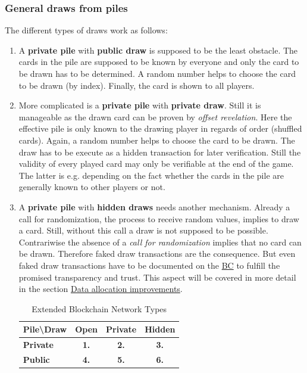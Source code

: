 \subsubsection{General draws from piles}
\label{sec:GDfP}
The different types of draws work as follows:
\begin{enumerate}	
	\item A \textbf{private pile} with \textbf{public draw} is supposed to be the least obstacle.
	The cards in the pile are supposed to be known by everyone and only the card to be drawn has to be determined.
	A random number helps to choose the card to be drawn (by index).
	Finally, the card is shown to all players.
	
	\item More complicated is a \textbf{private pile} with \textbf{private draw}.
	Still it is manageable as the drawn card can be proven by \textit{offset revelation}.
	Here the effective pile is only known to the drawing player in regards of order (shuffled cards).
	Again, a random number helps to choose the card to be drawn.
	The draw has to be execute as a hidden transaction for later verification.
	Still the validity of every played card may only be verifiable at the end of the game.
	The latter is e.g. depending on the fact whether the cards in the pile are generally known to other players or not.
	
	\item A \textbf{private pile} with \textbf{hidden draws} needs another mechanism.
	Already a call for randomization, the process to receive random values, implies to draw a card.
	Still, without this call a draw is not supposed to be possible.
	Contrariwise the absence of a \textit{call for randomization} implies that no card can be drawn.
	Therefore faked draw transactions are the consequence.
	But even faked draw transactions have to be documented on the \hyperref[sec:BCI]{BC} to fulfill the promised transparency and trust.
	This aspect will be covered in more detail in the section \hyperref[sec:DataAllocationImprovements]{Data allocation improvements}.
	
	\begin{table}
		\centering
		\begin{tabularx}{0.525\textwidth}{ l | c | c | c }
			\textbf{Pile\textbackslash Draw} & \textbf{Open} & \textbf{Private} & \textbf{Hidden} \\ \hline
			\textbf{Private} & \textbf{1.} & \textbf{2.} & \textbf{3.} \\ \hline
			\textbf{Public} & \textbf{4.} & \textbf{5.} & \textbf{6.} \\
		\end{tabularx}
		\caption{Extended Blockchain Network Types}
		\label{tbl:Card draw scenarios}
	\end{table}
	

\end{enumerate}
